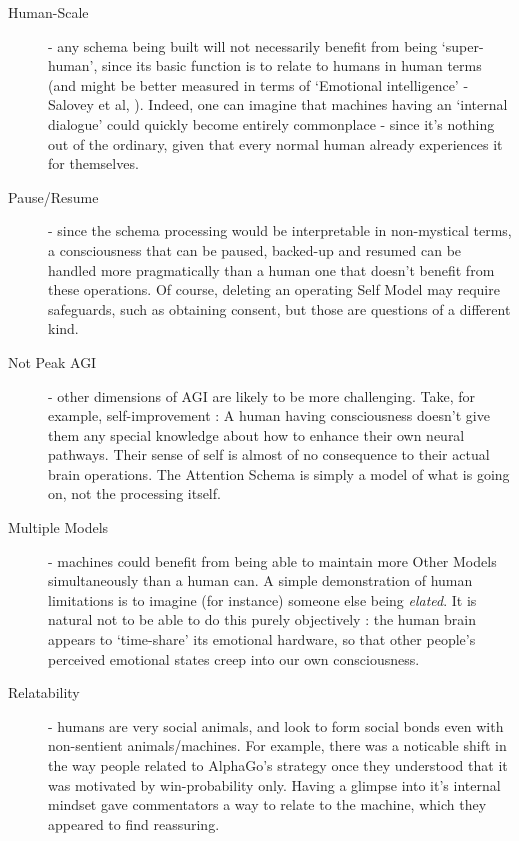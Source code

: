 \documentclass[citeauthoryear]{llncs}
\begin{document}
\begin{description}

\item[Human-Scale] - any schema being built will not necessarily
benefit from being `super-human', since its basic function is to relate to
humans in human terms (and might be better measured in terms of `Emotional intelligence' - 
Salovey et al, \cite{EmotionalIntelligence}).
%
Indeed, one can imagine that machines having an `internal dialogue' could
quickly become entirely commonplace - since it's nothing out of the ordinary, 
given that every normal human already experiences it for themselves.

\item[Pause/Resume] - since the schema processing would be interpretable
in non-mystical terms, a consciousness that can be paused, backed-up and resumed 
can be handled more pragmatically than a human one that doesn't benefit from these
operations.  
%
Of course, deleting an operating Self Model may require safeguards, such as obtaining
consent, but those are questions of a different kind.

\item[Not Peak AGI] - other dimensions of AGI are likely to be more challenging.
Take, for example, self-improvement : A human having consciousness doesn't 
give them any special knowledge about how to enhance their own neural pathways.
Their sense of self is almost of no consequence to their actual brain operations.
The Attention Schema is simply a model of what is going on, not the processing
itself. 

\item[Multiple Models] - machines could benefit from being able to maintain
more Other Models simultaneously than a human can.  A simple demonstration of 
human limitations is to imagine (for instance) someone else being \emph{elated}.  
It is natural not to be able to do this purely objectively : the human brain 
appears to `time-share' its emotional hardware, so that other people's perceived 
emotional states creep into our own consciousness.

\item[Relatability] - humans are very social animals, and look to form 
social bonds even with non-sentient animals/machines.  For example, 
there was a noticable shift in the way people related to AlphaGo's strategy 
once they understood that it was motivated by win-probability only.
Having a glimpse into it's internal mindset gave commentators a way to 
relate to the machine, which they appeared to find reassuring.


\end{description}
\end{document}
